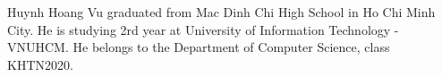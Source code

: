 
\begin{IEEEbiography}{Huynh Hoang Vu}
graduated from Mac Dinh Chi High School in Ho Chi Minh City. He is studying 2rd year at University of Information Technology - VNUHCM. He belongs to the Department of Computer Science, class KHTN2020.
\end{IEEEbiography}

